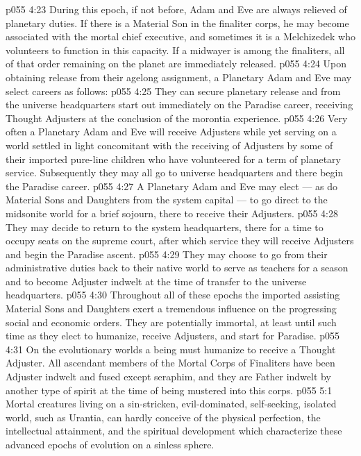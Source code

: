 \vs p055 4:23 During this epoch, if not before, Adam and Eve are always relieved of planetary duties. If there is a Material Son in the finaliter corps, he may become associated with the mortal chief executive, and sometimes it is a Melchizedek who volunteers to function in this capacity. If a midwayer is among the finaliters, all of that order remaining on the planet are immediately released.
\vs p055 4:24 \pc Upon obtaining release from their agelong assignment, a Planetary Adam and Eve may select careers as follows:
\vs p055 4:25 \bibnobreakspace They can secure planetary release and from the universe headquarters start out immediately on the Paradise career, receiving Thought Adjusters at the conclusion of the morontia experience.
\vs p055 4:26 \bibnobreakspace Very often a Planetary Adam and Eve will receive Adjusters while yet serving on a world settled in light concomitant with the receiving of Adjusters by some of their imported pure\hyp{}line children who have volunteered for a term of planetary service. Subsequently they may all go to universe headquarters and there begin the Paradise career.
\vs p055 4:27 \bibnobreakspace A Planetary Adam and Eve may elect --- as do Material Sons and Daughters from the system capital --- to go direct to the midsonite world for a brief sojourn, there to receive their Adjusters.
\vs p055 4:28 \bibnobreakspace They may decide to return to the system headquarters, there for a time to occupy seats on the supreme court, after which service they will receive Adjusters and begin the Paradise ascent.
\vs p055 4:29 \bibnobreakspace They may choose to go from their administrative duties back to their native world to serve as teachers for a season and to become Adjuster indwelt at the time of transfer to the universe headquarters.
\vs p055 4:30 \pc Throughout all of these epochs the imported assisting Material Sons and Daughters exert a tremendous influence on the progressing social and economic orders. They are potentially immortal, at least until such time as they elect to humanize, receive Adjusters, and start for Paradise.
\vs p055 4:31 On the evolutionary worlds a being must humanize to receive a Thought Adjuster. All ascendant members of the Mortal Corps of Finaliters have been Adjuster indwelt and fused except seraphim, and they are Father indwelt by another type of spirit at the time of being mustered into this corps.
\vs p055 5:1 Mortal creatures living on a sin\hyp{}stricken, evil\hyp{}dominated, self\hyp{}seeking, isolated world, such as Urantia, can hardly conceive of the physical perfection, the intellectual attainment, and the spiritual development which characterize these advanced epochs of evolution on a sinless sphere.
